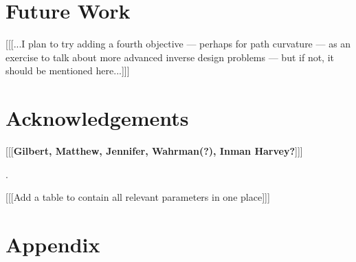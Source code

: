 \documentclass[letterpaper]{article}
\begin{document}
\section{Future Work}
\label{sec:future}

[[[...I plan to try adding a fourth objective --- perhaps for path curvature --- as an exercise to talk about more advanced inverse design problems --- but if not, it should be mentioned here...]]]

\section{Acknowledgements}
\label{sec:ack}

[[[\textbf{Gilbert, Matthew, Jennifer, Wahrman(?), Inman Harvey?}]]]


.

[[[Add a table to contain all relevant parameters in one place]]]






\appendix
\onecolumn
\section{Appendix}
\label{sec:appendix}
\end{document}
